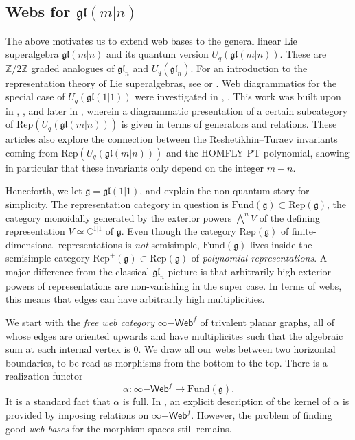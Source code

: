 \documentclass[11pt,a4paper,reqno]{amsart}
\newcommand{\g}{\mathfrak{g}}
\newcommand{\gl}{\mathfrak{gl}}
\newcommand{\rep}{\mathrm{Rep}}
\newcommand{\C}{\mathbb{C}}
\newcommand{\Z}{\mathbb{Z}}
\numberwithin{equation}{section}
\theoremstyle{definition}
\theoremstyle{remark}
\begin{document}
\subsection{Webs for \texorpdfstring{$\gl(m|n)$}{gl(m|n)}}

The above motivates us to extend web bases to the general linear Lie superalgebra $\gl(m|n)$ and its quantum version $U_q(\gl(m|n))$. These are $\Z/2\Z$ graded analogues of $\gl_n$ and $U_q(\gl_n)$. For an introduction to the representation theory of Lie superalgebras, see \cite{cheng-wang} or \cite{musson}. Web diagrammatics for the special case of $U_q(\gl(1|1))$ were investigated in \cite{grant16}, \cite{Sartori2013CategorificationOT}. This work was built upon in \cite{queffelec-sartori}, \cite{queffelec2015noteglmnlinkinvariants}, and later in \cite{tubbenhauer-vaz-wedrich}, wherein a diagrammatic presentation of a certain subcategory of $\mathrm{Rep}(U_q(\gl(m|n)))$ is given in terms of generators and relations. These articles also explore the connection between the Reshetikhin--Turaev invariants coming from $\rep(U_q(\gl(m|n)))$ and the HOMFLY-PT polynomial, showing in particular that these invariants only depend on the integer $m-n$. 

Henceforth, we let $\g = \gl(1|1)$, and explain the non-quantum story for simplicity. The representation category in question is $\mathrm{Fund}(\g)\subset \rep(\g)$, the category monoidally generated by the exterior powers $\bigwedge^nV$ of the defining representation $V\simeq \C^{1|1}$ of $\g$. Even though the category $\rep(\g)$ of finite-dimensional representations is \emph{not} semisimple, $\mathrm{Fund}(\g)$ lives inside the semisimple category $\rep^+(\g)\subset \rep(\g)$ of \emph{polynomial representations}. A major difference from the classical $\gl_n$ picture is that arbitrarily high exterior powers of representations are non-vanishing in the super case. In terms of webs, this means that edges can have arbitrarily high multiplicities.

We start with the \emph{free web category} $\infty\mathsf{-Web}^f$ of trivalent planar graphs, all of whose edges are oriented upwards and have multiplicites such that the algebraic sum at each internal vertex is $0$. We draw all our webs between two horizontal boundaries, to be read as morphisms from the bottom to the top. There is a realization functor 
\[\alpha: \infty\mathsf{-Web}^f\longrightarrow \mathrm{Fund}(\g).\]
It is a standard fact that $\alpha$ is full. In \cite{tubbenhauer-vaz-wedrich}, an explicit description of the kernel of $\alpha$ is provided by imposing relations on $\infty\mathsf{-Web}^f$. However, the problem of finding good \emph{web bases} for the morphism spaces still remains. 
\end{document}
